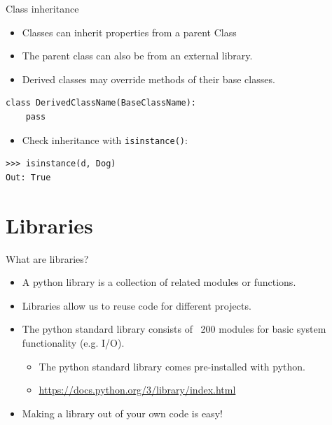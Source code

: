 \documentclass[compress%
,aspectratio=169%
]{beamer}
\newcommand{\code}{\lstinline}
\begin{document}
\begin{frame}[fragile]{Class inheritance}
\begin{itemize}
    \item Classes can inherit properties from a parent Class
    \item The parent class can also be from an external library.
    \item Derived classes may override methods of their base classes.
\end{itemize}
\begin{lstlisting}
class DerivedClassName(BaseClassName):
    pass
\end{lstlisting}
\begin{itemize}
    \item Check inheritance with \code|isinstance()|:
\end{itemize}
\begin{lstlisting}
>>> isinstance(d, Dog)
Out: True
\end{lstlisting}
\end{frame}



\section{Libraries}

\begin{frame}[fragile]{What are libraries?}

\begin{itemize}
    \item A python library is a collection of related modules or functions.
    \item Libraries allow us to reuse code for different projects.

    \item The python standard library consists of ~200 modules for basic system functionality (e.g. I/O).
    \begin{itemize}
        \item The python standard library comes pre-installed with python. 
        \item \url{https://docs.python.org/3/library/index.html}
    \end{itemize}

    \item Making a library out of your own code is easy!

\end{itemize}
    
\end{frame}
\end{document}
